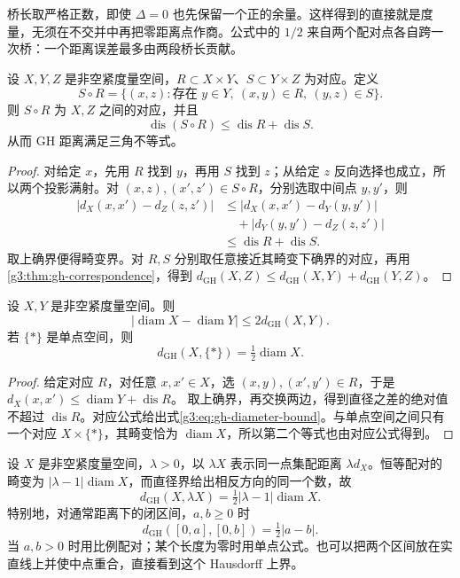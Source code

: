 桥长取严格正数，即使 \(\Delta=0\) 也先保留一个正的余量。这样得到的直接就是度量，无须在不交并中再把零距离点作商。公式中的 \(1/2\) 来自两个配对点各自跨一次桥：一个距离误差最多由两段桥长贡献。

\begin{proposition}\label{g3:prop:correspondence-composition}
	设 \(X,Y,Z\) 是非空紧度量空间，\(R\subset X\times Y\)、\(S\subset Y\times Z\) 为对应。定义
	\[
		S\circ R=\{(x,z):\text{存在 }y\in Y,\ (x,y)\in R,\ (y,z)\in S\}.
	\]
	则 \(S\circ R\) 为 \(X,Z\) 之间的对应，并且
	\[
		\operatorname{dis}(S\circ R)\le\operatorname{dis}R+\operatorname{dis}S.
	\]
	从而 GH 距离满足三角不等式。
\end{proposition}
\begin{proof}
	对给定 \(x\)，先用 \(R\) 找到 \(y\)，再用 \(S\) 找到 \(z\)；从给定 \(z\) 反向选择也成立，所以两个投影满射。对 \((x,z),(x',z')\in S\circ R\)，分别选取中间点 \(y,y'\)，则
	\[
	\begin{aligned}
		|d_X(x,x')-d_Z(z,z')|
		&\le |d_X(x,x')-d_Y(y,y')|\\
		&\quad+|d_Y(y,y')-d_Z(z,z')|\\
		&\le\operatorname{dis}R+\operatorname{dis}S.
	\end{aligned}
	\]
	取上确界便得畸变界。对 \(R,S\) 分别取任意接近其畸变下确界的对应，再用\cref{g3:thm:gh-correspondence}，得到
	\(d_{\mathrm{GH}}(X,Z)\le d_{\mathrm{GH}}(X,Y)+d_{\mathrm{GH}}(Y,Z)\)。
\end{proof}

\begin{proposition}\label{g3:prop:gh-diameter}
	设 \(X,Y\) 是非空紧度量空间。则
	\begin{equation}\label{g3:eq:gh-diameter-bound}
		|\operatorname{diam}X-\operatorname{diam}Y|
		\le2d_{\mathrm{GH}}(X,Y).
	\end{equation}
	若 \(\{*\}\) 是单点空间，则
	\[
		d_{\mathrm{GH}}(X,\{*\})=\tfrac12\operatorname{diam}X.
	\]
\end{proposition}
\begin{proof}
	给定对应 \(R\)，对任意 \(x,x'\in X\)，选 \((x,y),(x',y')\in R\)，于是
	\(d_X(x,x')\le\operatorname{diam}Y+\operatorname{dis}R\)。
	取上确界，再交换两边，得到直径之差的绝对值不超过 \(\operatorname{dis}R\)。对应公式给出式\eqref{g3:eq:gh-diameter-bound}。与单点空间之间只有一个对应 \(X\times\{*\}\)，其畸变恰为 \(\operatorname{diam}X\)，所以第二个等式也由对应公式得到。
\end{proof}

\begin{example}\label{g3:exm:gh-scaling-interval}
	设 \(X\) 是非空紧度量空间，\(\lambda>0\)，以 \(\lambda X\) 表示同一点集配距离 \(\lambda d_X\)。恒等配对的畸变为 \(|\lambda-1|\operatorname{diam}X\)，而直径界给出相反方向的同一个数，故
	\[
		d_{\mathrm{GH}}(X,\lambda X)
		=\tfrac12|\lambda-1|\operatorname{diam}X.
	\]
	特别地，对通常距离下的闭区间，\(a,b\ge0\) 时
	\[
		d_{\mathrm{GH}}([0,a],[0,b])=\tfrac12|a-b|.
	\]
	当 \(a,b>0\) 时用比例配对；某个长度为零时用单点公式。也可以把两个区间放在实直线上并使中点重合，直接看到这个 Hausdorff 上界。
\end{example}

